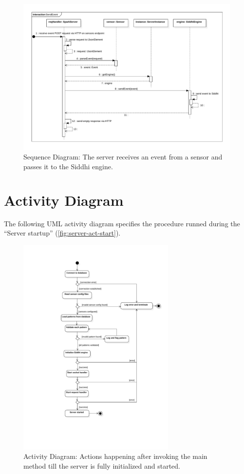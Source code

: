 \begin{figure}[h]
    \centering
    \includegraphics[width=\textwidth]{../module_res/server-sd-sendevent.pdf}
    \caption{Sequence Diagram:
        The server receives an event from a sensor and passes it to the Siddhi
        engine.
    \label{fig:server-sd-sendevent}}
\end{figure}
\FloatBarrier


\section{Activity Diagram}
The following UML activity diagram specifies the procedure runned during the
\enquote{Server startup} (\autoref{fig:server-act-start}).

\FloatBarrier
\begin{figure}[h]
    \centering
    \includegraphics[width=0.7\textwidth]{../module_res/server-act-start.pdf}
    \caption{Activity Diagram:
        Actions happening after invoking the main method till the server is
        fully initialized and started.
    \label{fig:server-act-start}}
\end{figure}
\FloatBarrier
